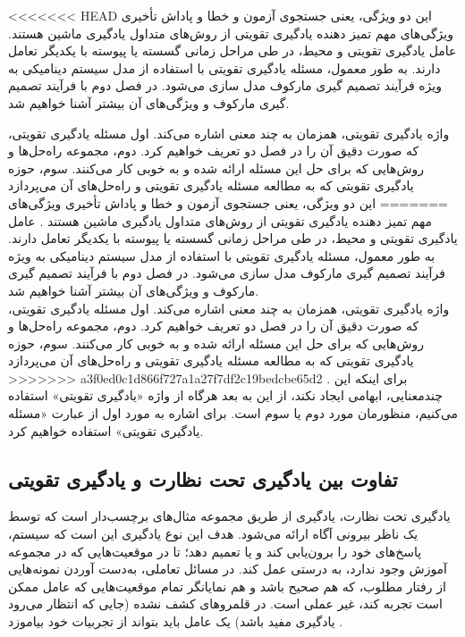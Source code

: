 

 
 

<<<<<<< HEAD
این دو ویژگی،  یعنی جستجوی آزمون و خطا و پاداش تأخیری ویژگی‌های مهم تمیز دهنده یادگیری تقویتی از روش‌های متداول یادگیری ماشین هستند.
 عامل یادگیری تقویتی و محیط، در طی مراحل زمانی گسسته یا پیوسته با یکدیگر تعامل دارند. به طور معمول، مسئله یادگیری تقویتی با استفاده از مدل سیستم دینامیکی به ویژه فرآیند تصمیم گیری مارکوف مدل سازی می‌شود. در فصل دوم با فرآیند تصمیم گیری مارکوف و ویژگی‌های آن بیشتر آشنا خواهیم شد.

واژه یادگیری تقویتی، همزمان به چند معنی اشاره می‌کند. اول مسئله یادگیری تقویتی، که صورت دقیق آن را در فصل دو تعریف خواهیم کرد. دوم، مجموعه راه‌حل‌ها و روش‌هایی که برای حل این مسئله ارائه شده و به خوبی کار می‌کنند. سوم، حوزه یادگیری تقویتی که به مطالعه مسئله یادگیری تقویتی و راه‌حل‌های آن می‌پردازد
=======
این دو ویژگی،  یعنی جستجوی آزمون و خطا و پاداش تأخیری ویژگی‌های مهم تمیز دهنده یادگیری تقویتی از روش‌های متداول یادگیری ماشین هستند \cite{suttonbook}.
 عامل یادگیری تقویتی و محیط، در طی مراحل زمانی گسسته یا پیوسته با یکدیگر تعامل دارند. به طور معمول، مسئله یادگیری تقویتی با استفاده از مدل سیستم دینامیکی به ویژه فرآیند تصمیم گیری مارکوف مدل سازی می‌شود. در فصل دوم با فرآیند تصمیم گیری مارکوف و ویژگی‌های آن بیشتر آشنا خواهیم شد.\\
 واژه یادگیری تقویتی، همزمان به چند معنی اشاره می‌کند. اول مسئله یادگیری تقویتی، که صورت دقیق آن را در فصل دو تعریف خواهیم کرد. دوم، مجموعه راه‌حل‌ها و روش‌هایی که برای حل این مسئله ارائه شده و به خوبی کار می‌کنند. سوم، حوزه یادگیری تقویتی که به مطالعه مسئله یادگیری تقویتی و راه‌حل‌های آن می‌پردازد
>>>>>>> a3f0ed0c1d866f727a1a27f7df2c19bedcbe65d2
\cite{suttonbook}.
 برای اینکه این چندمعنایی، ابهامی ایجاد نکند، از این به بعد هرگاه از واژه «یادگیری تقویتی» استفاده می‌کنیم، منظورمان  مورد دوم یا سوم است. برای اشاره به مورد اول از عبارت «مسئله یادگیری تقویتی» استفاده خواهیم کرد. 
\subsection*{تفاوت بین یادگیری تحت نظارت و یادگیری تقویتی}
یادگیری تحت نظارت، یادگیری از طریق مجموعه مثال‌های برچسب‌دار است که توسط یک ناظر بیرونی آگاه ارائه می‌شود. هدف این نوع یادگیری این است که سیستم، پاسخ‌های خود را برون‌یابی کند و یا تعمیم دهد؛ تا در موقعیت‌هایی که در مجموعه آموزش وجود ندارد، به درستی عمل کند. در مسائل تعاملی، به‌دست آوردن نمونه‌هایی از رفتار مطلوب، که هم صحیح باشد و هم نمایانگر تمام موقعیت‌هایی که عامل ممکن است تجربه کند، غیر عملی است. در قلمروهای کشف نشده (جایی که انتظار می‌رود یادگیری مفید باشد) یک عامل باید بتواند از تجربیات خود بیاموزد
\cite{suttonbook}.
